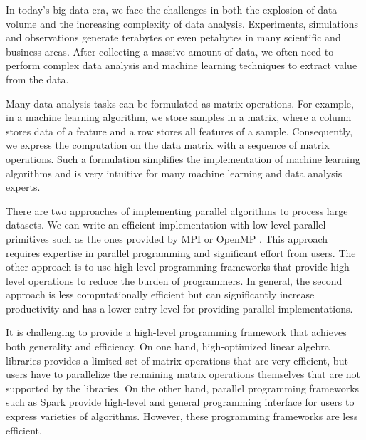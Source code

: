 
In today's big data era, we face the challenges in both the explosion of
data volume and the increasing complexity of data analysis. Experiments,
simulations and observations generate terabytes or
even petabytes in many scientific and business areas. After collecting
a massive amount of data, we often need to perform complex data analysis
and machine learning techniques to extract value from the data.

Many data analysis tasks can be formulated as matrix operations. For example,
in a machine learning algorithm, we store samples in a matrix, where a column
stores data of a feature and a row stores all features of a sample.
Consequently, we express the computation on the data matrix with a sequence
of matrix operations. Such a formulation simplifies the implementation of
machine learning algorithms and is very intuitive for many machine learning
and data analysis experts.


There are two approaches of implementing parallel algorithms to process large
datasets. We can write an efficient implementation with low-level parallel
primitives such as the ones provided by MPI \cite{mpi} or OpenMP \cite{openmp}.
This approach requires expertise in parallel programming and significant
effort from users. The other approach is to use high-level programming
frameworks that provide high-level operations to reduce the burden of
programmers. In general, the second approach is less computationally
efficient but can significantly increase productivity and has a lower
entry level for providing parallel implementations.


It is challenging to provide a high-level programming framework
that achieves both generality and efficiency. On one hand, high-optimized
linear algebra libraries \cite{mkl, openblas, elemental, trilinos, petsc}
provides a limited set of matrix operations that are very efficient, but
users have to parallelize the remaining matrix operations themselves
that are not supported by the libraries. On the other hand,
parallel programming frameworks such as Spark \cite{spark} provide high-level
and general programming interface for users to express varieties of algorithms.
However, these programming frameworks are less efficient.

